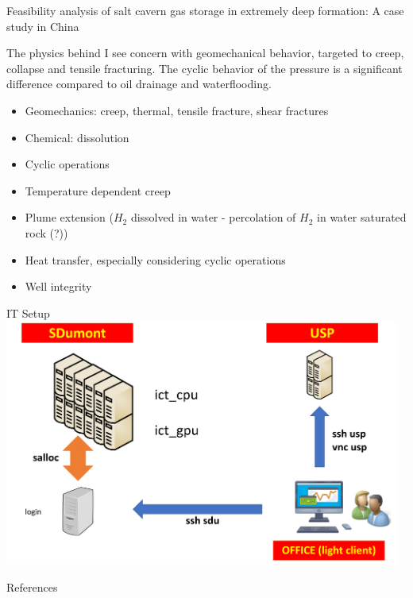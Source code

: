 \begin{frame}{\cite{zhao22} Feasibility analysis of salt cavern gas storage in extremely deep formation: A case study in China}
\end{frame}
%
%
\begin{frame}{The physics behind}
I see concern with geomechanical behavior, targeted to creep, collapse and tensile fracturing. The cyclic behavior of the pressure is a significant difference compared to oil drainage and waterflooding.
\begin{itemize}
\item Geomechanics: creep, thermal, tensile fracture, shear fractures
\item Chemical: dissolution
\item Cyclic operations
\item Temperature dependent creep
\item Plume extension ($H_2$ dissolved in water - percolation of $H_2$ in water saturated rock (?))
\item Heat transfer, especially considering cyclic operations
\item Well integrity
\end{itemize}
\end{frame}

\begin{frame}{IT Setup}
\includegraphics[width=13cm]{it_archit}
\end{frame}

\begin{frame}[shrink=50,fragile]{References}


\end{frame}

